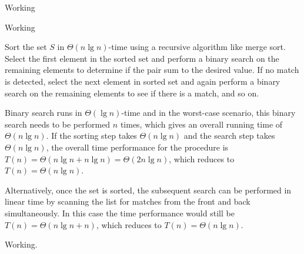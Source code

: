 \documentclass[a4paper,12pt]{article}
\begin{document}
Working

\vspace{5mm}


Working

\vspace{5mm}


Sort the set $S$ in $\Theta(n\lg n)$-time using a recursive algorithm like merge sort. Select the first element in the sorted 
set and perform a binary search on the remaining elements to determine if the pair sum to the desired value. If no match 
is detected, select the next element in sorted set and again perform a binary search on the remaining elements to see if there is a match, and so on.

Binary search runs in $\Theta(\lg n)$-time and in the worst-case scenario, this binary search needs to be performed $n$ times, which 
gives an overall running time of $\Theta(n \lg n)$. If the sorting step takes $\Theta(n \lg n)$ and the search step takes $\Theta (n \lg n)$, the overall time performance 
for the procedure is $T(n) = \Theta(n\lg n + n\lg n) = \Theta(2n\lg n)$, which reduces to $T(n) = \Theta(n \lg n)$.

Alternatively, once the set is sorted, the subsequent search can be performed in linear time by scanning the list for matches from the front and back simultaneously. 
In this case the time performance would still be $T(n) = \Theta(n \lg n +n)$, which reduces to $T(n) = \Theta(n \lg n)$.

Working.
\end{document}
